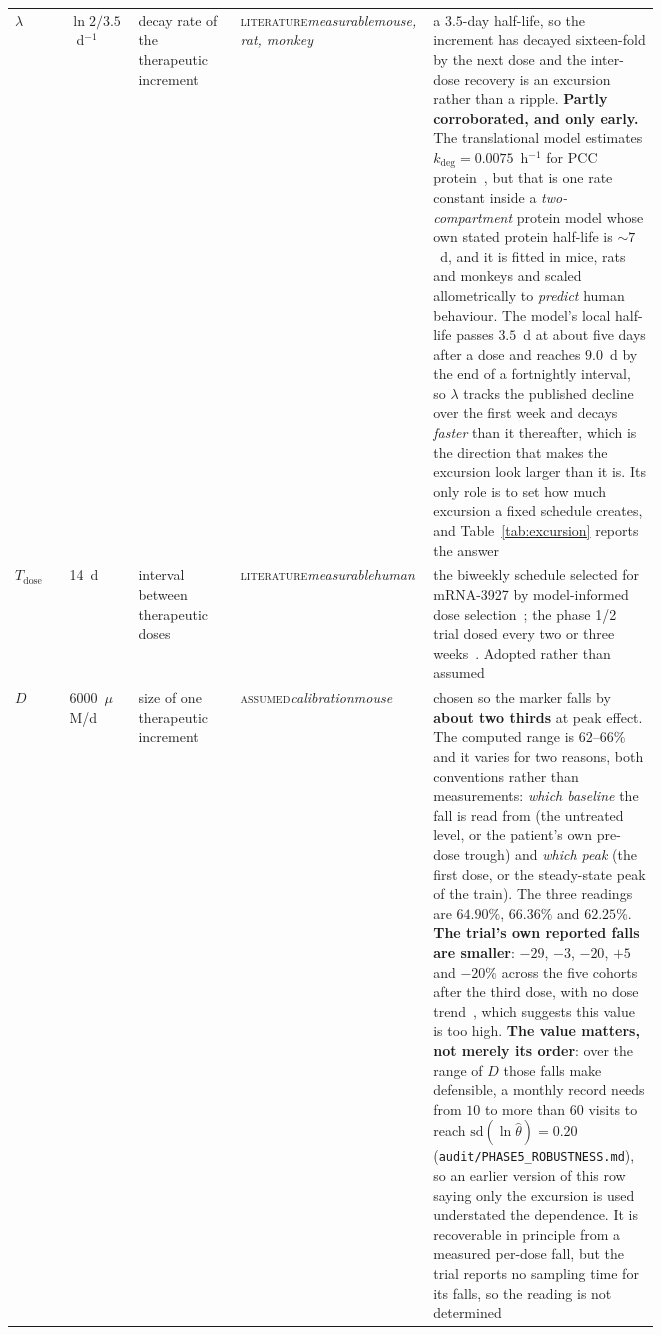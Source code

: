 \begin{longtable}{@{}p{0.08\linewidth} p{0.10\linewidth} p{0.15\linewidth} p{0.085\linewidth} p{0.335\linewidth}@{}}
$\lambda$ & $\ln 2/3.5$~d$^{-1}$ & decay rate of the therapeutic increment & \textsc{literature}\newline \emph{measurable}\newline \emph{mouse, rat, monkey} & a $3.5$-day half-life, so the increment has decayed sixteen-fold by the next dose and the inter-dose recovery is an excursion rather than a ripple. \textbf{Partly corroborated, and only early.} The translational model estimates $k_{\deg} = 0.0075$~h$^{-1}$ for PCC protein~\cite{pkpd_translational}, but that is one rate constant inside a \emph{two-compartment} protein model whose own stated protein half-life is $\sim 7$~d, and it is fitted in mice, rats and monkeys and scaled allometrically to \emph{predict} human behaviour. The model's local half-life passes $3.5$~d at about five days after a dose and reaches $9.0$~d by the end of a fortnightly interval, so $\lambda$ tracks the published decline over the first week and decays \emph{faster} than it thereafter, which is the direction that makes the excursion look larger than it is. Its only role is to set how much excursion a fixed schedule creates, and Table~\ref{tab:excursion} reports the answer \\
$T_{\mathrm{dose}}$ & 14~d & interval between therapeutic doses & \textsc{literature}\newline \emph{measurable}\newline \emph{human} & the biweekly schedule selected for mRNA-3927 by model-informed dose selection~\cite{dose_selection_poster}; the phase 1/2 trial dosed every two or three weeks~\cite{trial_phase12}. Adopted rather than assumed \\
$D$ & $6000$~$\mu$M/d & size of one therapeutic increment & \textsc{assumed}\newline \emph{calibration}\newline \emph{mouse} & chosen so the marker falls by \textbf{about two thirds} at peak effect. The computed range is $62$--$66\%$ and it varies for two reasons, both conventions rather than measurements: \emph{which baseline} the fall is read from (the untreated level, or the patient's own pre-dose trough) and \emph{which peak} (the first dose, or the steady-state peak of the train). The three readings are $64.90\%$, $66.36\%$ and $62.25\%$. \textbf{The trial's own reported falls are smaller}: $-29$, $-3$, $-20$, $+5$ and $-20\%$ across the five cohorts after the third dose, with no dose trend~\cite{trial_phase12}, which suggests this value is too high. \textbf{The value matters, not merely its order}: over the range of $D$ those falls make defensible, a monthly record needs from $10$ to more than $60$ visits to reach $\mathrm{sd}(\ln\hat\theta) = 0.20$ (\texttt{audit/PHASE5\_ROBUSTNESS.md}), so an earlier version of this row saying only the excursion is used understated the dependence. It is recoverable in principle from a measured per-dose fall, but the trial reports no sampling time for its falls, so the reading is not determined \\

\end{longtable}
